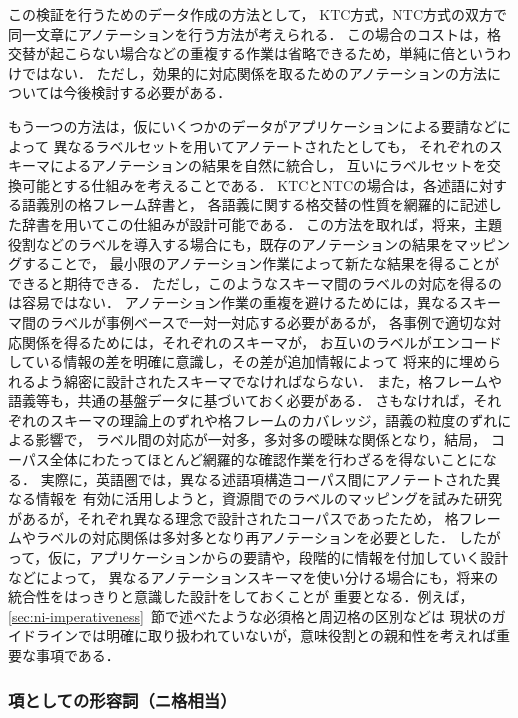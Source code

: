 \documentclass[japanese]{jnlp_1.4}
\begin{document}
この検証を行うためのデータ作成の方法として，
KTC方式，NTC方式の双方で同一文章にアノテーションを行う方法が考えられる．
この場合のコストは，格交替が起こらない場合などの重複する作業は省略できるため，単純に倍というわけではない．
ただし，効果的に対応関係を取るためのアノテーションの方法については今後検討する必要がある．

もう一つの方法は，仮にいくつかのデータがアプリケーションによる要請などによって
異なるラベルセットを用いてアノテートされたとしても，
それぞれのスキーマによるアノテーションの結果を自然に統合し，
互いにラベルセットを交換可能とする仕組みを考えることである．
KTCとNTCの場合は，各述語に対する語義別の格フレーム辞書と，
各語義に関する格交替の性質を網羅的に記述した辞書を用いてこの仕組みが設計可能である．
この方法を取れば，将来，主題役割などのラベルを導入する場合にも，既存のアノテーションの結果をマッピングすることで，
最小限のアノテーション作業によって新たな結果を得ることが
できると期待できる．
ただし，このようなスキーマ間のラベルの対応を得るのは容易ではない．
アノテーション作業の重複を避けるためには，異なるスキーマ間のラベルが事例ベースで一対一対応する必要があるが，
各事例で適切な対応関係を得るためには，それぞれのスキーマが，
お互いのラベルがエンコードしている情報の差を明確に意識し，その差が追加情報によって
将来的に埋められるよう綿密に設計されたスキーマでなければならない．
また，格フレームや語義等も，共通の基盤データに基づいておく必要がある．
さもなければ，それぞれのスキーマの理論上のずれや格フレームのカバレッジ，語義の粒度のずれによる影響で，
ラベル間の対応が一対多，多対多の曖昧な関係となり，結局，
コーパス全体にわたってほとんど網羅的な確認作業を行わざるを得ないことになる．
実際に，英語圏では，異なる述語項構造コーパス間にアノテートされた異なる情報を
有効に活用しようと，資源間でのラベルのマッピングを試みた研究があるが，それぞれ異なる理念で設計されたコーパスであったため，
格フレームやラベルの対応関係は多対多となり再アノテーションを必要とした\cite{loper2007combining,semlink}．
したがって，仮に，アプリケーションからの要請や，段階的に情報を付加していく設計などによって，
異なるアノテーションスキーマを使い分ける場合にも，将来の統合性をはっきりと意識した設計をしておくことが
重要となる．例えば，\ref{sec:ni-imperativeness}~節で述べたような必須格と周辺格の区別などは
現状のガイドラインでは明確に取り扱われていないが，意味役割との親和性を考えれば重要な事項である．


\subsubsection{項としての形容詞（ニ格相当）}
\label{sec:adjective-ni}
\end{document}
